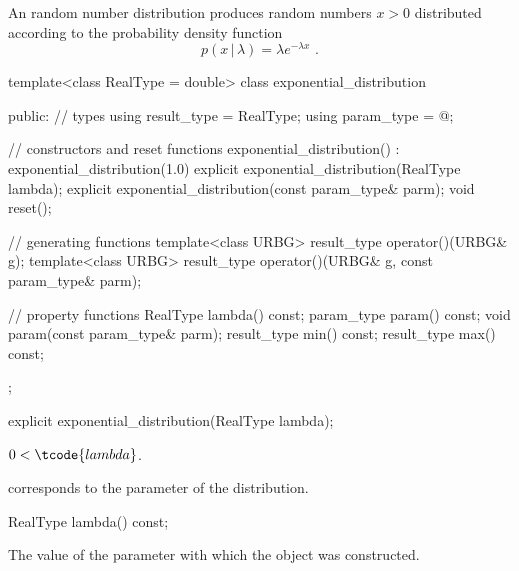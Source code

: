 \pnum
An  random number distribution
produces random numbers $x > 0$
distributed according to
the probability density function%
%
%
\[ p(x\,|\,\lambda) = \lambda e^{-\lambda x} \text{ .} \]

%
%
\begin{codeblock}
template<class RealType = double>
  class exponential_distribution {
  public:
    // types
    using result_type = RealType;
    using param_type  = @\unspec@;

    // constructors and reset functions
    exponential_distribution() : exponential_distribution(1.0) {}
    explicit exponential_distribution(RealType lambda);
    explicit exponential_distribution(const param_type& parm);
    void reset();

    // generating functions
    template<class URBG>
      result_type operator()(URBG& g);
    template<class URBG>
      result_type operator()(URBG& g, const param_type& parm);

    // property functions
    RealType lambda() const;
    param_type param() const;
    void param(const param_type& parm);
    result_type min() const;
    result_type max() const;
  };
\end{codeblock}


\begin{indexed}{}
\begin{itemdecl}
explicit exponential_distribution(RealType lambda);
\end{itemdecl}
\end{indexed}

\begin{itemdescr}
\pnum
\expects
$0 < \tcode{lambda}$.

\pnum
\remarks
{} corresponds to the parameter of the distribution.
\end{itemdescr}

\begin{indexed}{}
\begin{itemdecl}
RealType lambda() const;
\end{itemdecl}
\end{indexed}

\begin{itemdescr}
\pnum
\returns
The value of the  parameter
 with which the object was constructed.
\end{itemdescr}

